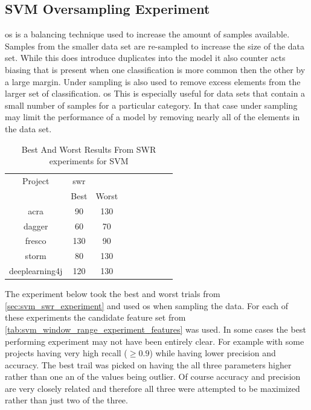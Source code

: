 \subsection{SVM Oversampling Experiment}
\label{sec:svm_os_experiment}

\gls{os} is a balancing technique used to increase the amount of samples available. Samples from the smaller data set are re-sampled to increase the size of the data set. While this does introduce duplicates into the model it also counter acts biasing that is present when one classification is more common then the other by a large margin. Under sampling is also used to remove excess elements from the larger set of classification. \gls{os} This is especially useful for data sets that contain a small number of samples for a particular category. In that case under sampling may limit the performance of a model by removing nearly all of the elements in the data set.

\begin{table}[ht]
\begin{center}

    \begin{tabular}{|c|c|c|c|c|c|c|c|c|}
        \hline
        Project & \multicolumn{1}{c}{\gls{swr}} & \\
         & \multicolumn{1}{c}{Best} & \multicolumn{1}{c|}{Worst} \\
         \hline
        acra & 90 & 130 \\
        dagger & 60 & 70 \\
        fresco & 130 & 90 \\
        storm & 80 & 130 \\
        deeplearning4j & 120 & 130 \\ \hline
    \end{tabular}
    \caption{Best And Worst Results From SWR experiments for SVM}
    \label{tab:svm_best_worst_swr_experiment_sets}
\end{center}
\end{table}

The experiment below took the best and worst trials from \autoref{sec:svm_swr_experiment} and used \gls{os} when sampling the data. For each of these experiments the candidate feature set from \autoref{tab:svm_window_range_experiment_features} was used. In some cases the best performing experiment may not have been entirely clear. For example with some projects having very high recall ($ \geq 0.9$) while having lower precision and accuracy. The best trail was picked on having the all three parameters higher rather than one an of the values being outlier. Of course accuracy and precision are very closely related and therefore all three were attempted to be maximized rather than just two of the three.

